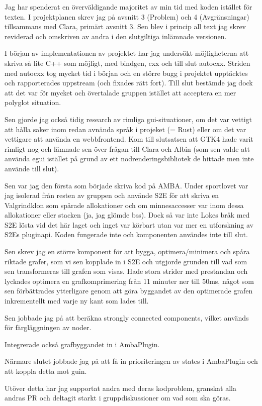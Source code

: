 Jag har spenderat en överväldigande majoritet av min tid med koden
istället för texten. I projektplanen skrev jag på avsnitt 3 (Problem)
och 4 (Avgränsningar) tillsammans med Clara, primärt avsnitt 3. Sen
blev i princip all text jag skrev reviderad och omskriven av andra i
den slutgiltiga inlämnade versionen.

I början av implementationen av projektet har jag undersökt
möjligheterna att skriva så lite C++ som möjligt, med bindgen, cxx och
till slut autocxx.  Striden med autocxx tog mycket tid i början och en
större bugg i projektet upptäcktes och rapporterades uppstream (och
fixades rätt fort). Till slut bestämde jag dock att det var för mycket
och övertalade gruppen istället att acceptera en mer polyglot
situation.

Sen gjorde jag också tidig research av rimliga gui-situationer, om det
var vettigt att hålla saker inom redan avnända språk i projeket (=
Rust) eller om det var vettigare att använda en webbfrontend. Kom till
slutsatsen att GTK4 hade varit rimligt nog och lämnade sen över frågan
till Clara och Albin (som sen valde att använda egui istället på grund
av ett nodrenderingsbibliotek de hittade men inte använde till slut).

Sen var jag den första som började skriva kod på AMBA. Under
sportlovet var jag isolerad från resten av gruppen och använde S2E för
att skriva en Valgrindklon som spårade allokationer och om
minnesaccesser var inom dessa allokationer eller stacken (ja, jag
glömde bss). Dock så var inte Lokes bråk med S2E lösta vid det här
laget och inget var körbart utan var mer en utforskning av S2Es
pluginapi. Koden fungerade inte och komponenten användes inte till slut.

Sen skrev jag en större komponent för att bygga, optimera/minimera och
spåra riktade grafer, som vi sen kopplade in i S2E och utgjorde
grunden till vad som sen transformeras till grafen som visas.  Hade
stora strider med prestandan och lyckades optimera en grafkomprimering
från 11 minuter ner till 50ms, något som sen förbättrades ytterligare
genom att göra byggandet av den optimerade grafen inkrementellt med
varje ny kant som lades till.

Sen jobbade jag på att beräkna strongly connected components, vilket
används för färgläggningen av noder.

Integrerade också grafbyggandet in i AmbaPlugin.

Närmare slutet jobbade jag på att få in prioriteringen av states i
AmbaPlugin och att koppla detta mot guin.

Utöver detta har jag supportat andra med deras kodproblem, granskat
alla andras PR och deltagit starkt i gruppdiskussioner om vad som ska
göras.
